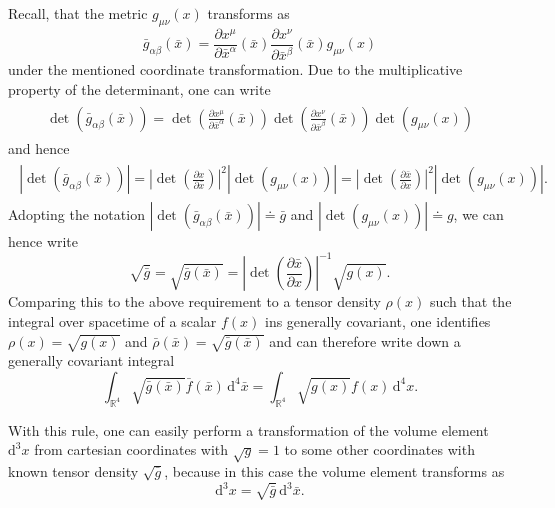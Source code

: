 \documentclass[a4paper,11pt]{article}
\numberwithin{equation}{section}
\begin{document}
{Recall, that the metric $g_{\mu\nu}(x)$ transforms as \begin{equation}
\bar{g}_{\alpha\beta}(\bar{x}) = \frac{\partial x^\mu}{\partial \bar{x}^\alpha}(\bar{x})\frac{\partial x^\nu}{\partial \bar{x}^\beta}(\bar{x})g_{\mu\nu}(x)
\end{equation} under the mentioned coordinate transformation. Due to the multiplicative property of the determinant, one can write \begin{align}
\begin{aligned}
\det\left(\bar{g}_{\alpha\beta}(\bar{x})\right) = \det\left(\frac{\partial x^\mu}{\partial \bar{x}^\alpha}(\bar{x})\right)\det\left(\frac{\partial x^\nu}{\partial \bar{x}^\beta}(\bar{x})\right)\det\left(g_{\mu\nu}(x)\right)
\end{aligned}
\end{align} and hence
\begin{align}
\begin{aligned}
\left|\det\left(\bar{g}_{\alpha\beta}(\bar{x})\right)\right| = \left|\det\left(\frac{\partial x}{\partial \bar{x}}\right)\right|^2\left|\det\left(g_{\mu\nu}(x)\right)\right| = \left|\det\left(\frac{\partial \bar{x}}{\partial x}\right)\right|^2\left|\det\left(g_{\mu\nu}(x)\right)\right|.
\end{aligned}
\end{align} Adopting the notation $\left|\det\left(\bar{g}_{\alpha\beta}(\bar{x})\right)\right| \doteq \bar{g}$ and $\left|\det\left(g_{\mu\nu}(x)\right)\right| \doteq g$, we can hence write \begin{equation}
\sqrt{\bar{g}} = \sqrt{\bar{g}(\bar{x})} = \left|\det\left(\frac{\partial \bar{x}}{\partial x}\right)\right|^{-1}\sqrt{g(x)}.
\end{equation} Comparing this to the above requirement to a tensor density $\rho(x)$ such that the integral over spacetime of a scalar $f(x)$ ins generally covariant, one identifies $\rho(x) = \sqrt{g(x)}$ and $\bar{\rho}(\bar{x}) = \sqrt{\bar{g}(\bar{x})}$ and can therefore write down a generally covariant integral \begin{equation}
\int_{\mathbb{R}^4} \sqrt{\bar{g}(\bar{x})}\bar{f}(\bar{x})\,\mathrm{d}^4\bar{x} = \int_{\mathbb{R}^4} \sqrt{g(x)}f(x)\,\mathrm{d}^4x.
\end{equation}%

With this rule, one can easily perform a transformation of the volume element $\mathrm{d}^3x$ from cartesian coordinates with $\sqrt{g} = 1$ to some other coordinates with known tensor density $\sqrt{\bar{g}}$, because in this case the volume element transforms as \begin{equation}
\mathrm{d}^3x = \sqrt{\bar{g}}\,\mathrm{d}^3\bar{x}.
\end{equation}
}
\end{document}
